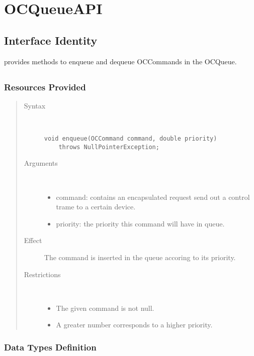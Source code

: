 \section{OCQueueAPI}

\subsection{Interface Identity}

\npar {} provides methods to enqueue and dequeue
OCCommands in the OCQueue.

\subsection{}

\subsubsection{Resources Provided}

\begin{quote}
	\begin{description}
		\item[Syntax] \ 
		\begin{verbatim}
void enqueue(OCCommand command, double priority) 
    throws NullPointerException;
		\end{verbatim}
		\item[Arguments] \
		\begin{itemize}
			\item command: contains an encapsulated request send out a control trame to
			a certain device.
			\item priority: the priority this command will have in queue. 
		\end{itemize}
		\item[Effect] The command is inserted in the queue accoring to its priority.
		\item[Restrictions] \ 
		\begin{itemize}
			\item The given command is not null.
			\item A greater number corresponds to a higher priority. 
		\end{itemize}
	\end{description} 
\end{quote}

\subsubsection{Data Types Definition}

